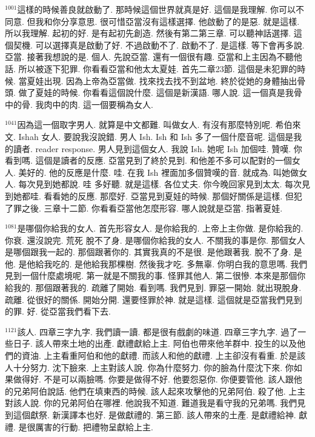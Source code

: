 \documentclass{book}
\begin{document}
$^{1001}$這樣的時候善良就啟動了.
那時候這個世界就真是好.
這個是我理解.
你可以不同意.
但我和你分享意思.
很可惜亞當沒有這樣選擇.
他啟動了的是惡.
就是這樣.
所以我理解.
起初的好.
是有起初先創造.
然後有第二第三章.
可以聽神話選擇.
這個契機.
可以選擇真是啟動了好.
不過啟動不了.
啟動不了.
是這樣.
等下會再多說.
亞當.
接著我想說的是.
個人.
先說亞當.
還有一個很有趣.
亞當和上主因為不聽他話.
所以被逐下犯罪.
你看看亞當和他太太夏娃.
首先二章23節.
這個是未犯罪的時候.
當夏娃出現.
因為上帝為亞當做.
找來找去找不到盆地.
終於從她的身體抽出骨頭.
做了夏娃的時候.
你看看這個說什麼.
這個是新漢語.
哪人說.
這一個真是我骨中的骨.
我肉中的肉.
這一個要稱為女人.

$^{1041}$因為這一個取字男人.
就算是中文都難.
叫做女人.
有沒有那麼特別呢.
希伯來文.
Ishah 女人.
要說我沒說錯.
男人 Ish.
Ish 和 Ish 多了一個什麼音呢.
這個是我的讀者.
reader response.
男人見到這個女人.
我說 Ish.
她呢 Ish 加個哇.
贊嘆.
你看到嗎.
這個是讀者的反應.
亞當見到了終於見到.
和他差不多可以配對的一個女人.
美好的.
他的反應是什麼.
哇.
在我 Ish 裡面加多個贊嘆的音.
就成為.
叫她做女人.
每次見到她都說.
哇 多好聽.
就是這樣.
各位丈夫.
你今晚回家見到太太.
每次見到她都哇.
看看她的反應.
那麼好.
亞當見到夏娃的時候.
那個好關係是這樣.
但犯了罪之後.
三章十二節.
你看看亞當他怎麼形容.
哪人說就是亞當.
指著夏娃.

$^{1081}$是哪個你給我的女人.
首先形容女人.
是你給我的.
上帝上主你做.
是你給我的.
你衰.
還沒說完.
荒死 脫不了身.
是哪個你給我的女人.
不關我的事是你.
那個女人是哪個跟我一起的.
那個跟著你的.
其實我真的不是很.
是他跟著我.
脫不了身.
是他.
是他給我吃的.
是他給我那棵樹.
然後我才吃.
多無辜.
你明白我的意思嗎.
我們見到一個什麼處境呢.
第一就是不關我的事.
怪罪其他人.
第二很慘.
本來是那個你給我的.
那個跟著我的.
疏離了開始.
看到嗎.
我們見到.
罪惡一開始.
就出現脫身.
疏離.
從很好的關係.
開始分開.
還要怪罪於神.
就是這樣.
這個就是亞當我們見到的罪.
好.
從亞當我們看下去.

$^{1121}$該人.
四章三字九字.
我們讀一讀.
都是很有戲劇的味道.
四章三字九字.
過了一些日子.
該人帶來土地的出產.
獻禮獻給上主.
阿伯也帶來他羊群中.
投生的以及他們的資油.
上主看重阿伯和他的獻禮.
而該人和他的獻禮.
上主卻沒有看重.
於是該人十分努力.
沈下臉來.
上主對該人說.
你為什麼努力.
你的臉為什麼沈下來.
你如果做得好.
不是可以兩臉嗎.
你要是做得不好.
他要怨惡你.
你便要管他.
該人跟他的兄弟阿伯說話.
他們在填東西的時候.
該人起來攻擊他的兄弟阿伯.
殺了他.
上主對該人說.
你的兄弟阿伯在哪裡.
他說我不知道.
難道我是看守我的兄弟嗎.
我們見到這個獻祭.
新漢譯本也好.
是做獻禮的.
第三節.
該人帶來的土產.
是獻禮給神.
獻禮.
是很厲害的行動.
把禮物呈獻給上主.
\end{document}
